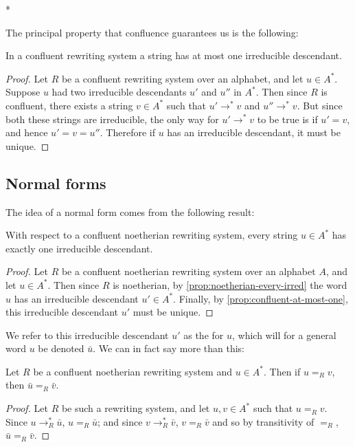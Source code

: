 \documentclass[noindex,noinsetproof,12pt]{lmaths}
\begin{document}
\medskip
\begin{center}*\end{center}

The principal property that confluence guarantees us is the following:

\begin{prop}
	In a confluent rewriting system a string has at most one irreducible descendant. \label{prop:confluent-at-most-one}
\end{prop}
\begin{proof}
	Let $R$ be a confluent rewriting system over an alphabet, and let $u \in A^*$. Suppose $u$ had two irreducible descendants $u'$ and $u''$ in $A^*$. Then since $R$ is confluent, there exists a string $v \in A^*$ such that $u' \to^* v$ and $u'' \to^* v$. But since both these strings are irreducible, the only way for $u' \to^* v$ to be true is if $u' = v$, and hence $u' = v = u''$. Therefore if $u$ has an irreducible descendant, it must be unique.
\end{proof}

\subsection{Normal forms} \label{sec:normal-forms}

The idea of a normal form comes from the following result:

\begin{prop}
	With respect to a confluent noetherian rewriting system, every string $u \in A^*$ has exactly one irreducible descendant.
\end{prop}
\begin{proof}
	Let $R$ be a confluent noetherian rewriting system over an alphabet $A$, and let $u \in A^*$. Then since $R$ is noetherian, by \cref{prop:noetherian-every-irred} the word $u$ has an irreducible descendant $u' \in A^*$. Finally, by \cref{prop:confluent-at-most-one}, this irreducible descendant $u'$ must be unique.
\end{proof}

We refer to this irreducible descendant $u'$ as the  for $u$, which will for a general word $u$ be denoted $\bar u$. We can in fact say more than this:

\begin{theorem}
	Let $R$ be a confluent noetherian rewriting system and $u \in A^*$. Then if $u =_R v$, then $\bar u =_R \bar v$.
\end{theorem}
\begin{proof}
	Let $R$ be such a rewriting system, and let $u, v \in A^*$ such that $u =_R v$. Since $u \to_R^* \bar u$, $u =_R \bar u$; and since $v \to_R^* \bar v$, $v =_R \bar v$ and so by transitivity of $=_R$, $\bar u =_R \bar v$.
\end{proof}
\end{document}
